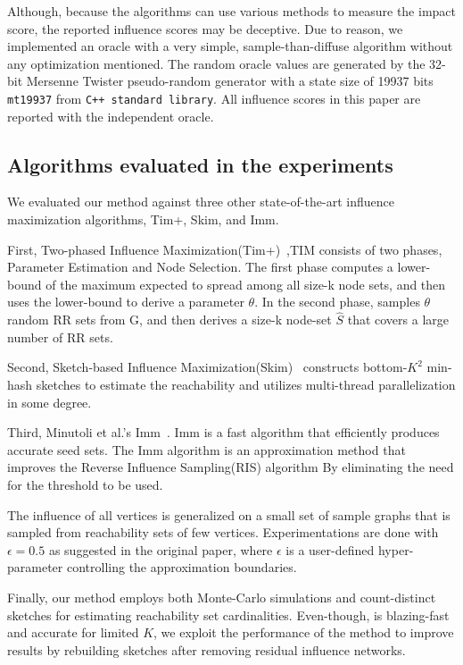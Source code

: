 \documentclass[10pt,journal,compsoc]{IEEEtran}
\newcommand\acro{{\sc{HyperFuseR\xspace}\xspace}\xspace}
\begin{document}
Although, because the algorithms can use various methods to measure the impact score, the reported influence scores may be deceptive. 
Due to reason, we implemented an oracle with a very simple, sample-than-diffuse algorithm without any optimization mentioned. The random oracle values are generated by the 32-bit Mersenne Twister pseudo-random generator with a state size of 19937 bits {\tt mt19937} from {\tt C++ standard library}. All influence scores in this paper are reported with the independent oracle.


\subsection{Algorithms evaluated in the experiments}

We evaluated our method against three other state-of-the-art influence maximization algorithms, {\sc Tim+}, {\sc Skim}, and {\sc Imm}.

First, Two-phased Influence Maximization({\sc Tim+})~\cite{tim},TIM consists of two phases, Parameter Estimation and Node Selection. The first phase computes a lower-bound
of the maximum expected to spread among all size-k node sets,
and then uses the lower-bound to derive a parameter $\theta$. In the second phase, samples $\theta$ random RR sets from
G, and then derives a size-k node-set $\hat{S}$ that covers a large number of RR sets.

Second, Sketch-based Influence Maximization({\sc Skim})~\cite{cohen2014sketch} constructs bottom-$K^2$ min-hash sketches to estimate the reachability and utilizes multi-thread parallelization in some degree. 

Third, Minutoli et al.'s {\sc Imm}~\cite{minutoli2019fast}. 
{\sc Imm} is a fast algorithm that efficiently produces accurate seed sets. 
The {\sc Imm}  algorithm\cite{tang2015influence} is an approximation method that improves the Reverse Influence Sampling(RIS)\cite{borgs2014maximizing} algorithm By eliminating the need for the threshold to be used.

The influence of all vertices is generalized on a small set of sample graphs that is sampled from reachability sets of few vertices.  Experimentations are done with $\epsilon = 0.5$ as suggested in the original paper, where $\epsilon$ is a user-defined hyper-parameter controlling the approximation boundaries.

Finally, our method \acro employs both Monte-Carlo simulations and count-distinct sketches for estimating reachability set cardinalities. Even-though, \acro is blazing-fast and accurate for limited $K$, we exploit the performance of the method to improve results by rebuilding sketches after removing residual influence networks.
\end{document}
